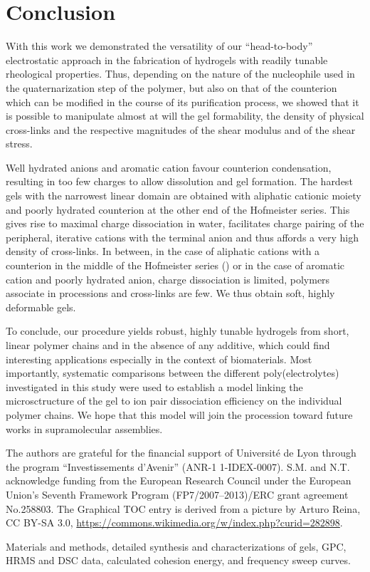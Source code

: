 \documentclass[journal=jacsat,manuscript=article]{achemso}
\begin{document}
\section{Conclusion}
With this work we demonstrated the versatility of our ``head-to-body'' electrostatic approach in the fabrication of hydrogels with readily tunable rheological properties. Thus, depending on the nature of the nucleophile used in the quaternarization step of the polymer, but also on that of the counterion which can be modified in the course of its purification process, we showed that it is possible to manipulate almost at will the gel formability, the density of physical cross-links and the respective magnitudes of the shear modulus and of the shear stress. 

Well hydrated anions and aromatic cation favour counterion condensation, resulting in too few charges to allow dissolution and gel formation. The hardest gels with the narrowest linear domain are obtained with aliphatic cationic moiety and poorly hydrated counterion at the other end of the Hofmeister series. This gives rise to maximal charge dissociation in water, facilitates charge pairing of the peripheral, iterative cations with the terminal anion and thus affords a very high density of cross-links. In between, in the case of aliphatic cations with a counterion in the middle of the Hofmeister series () or in the case of aromatic cation and poorly hydrated anion, charge dissociation is limited, polymers associate in processions and cross-links are few. We thus obtain soft, highly deformable gels.

To conclude, our procedure yields robust, highly tunable hydrogels from short, linear polymer chains and in the absence of any additive, which could find interesting applications especially in the context of biomaterials. Most importantly, systematic comparisons between the different poly(electrolytes) investigated in this study were used to establish a model linking the microsctructure of the gel to ion pair dissociation efficiency on the individual polymer chains. We hope that this model will join the procession toward future works in supramolecular assemblies.

\begin{acknowledgement}
The authors are grateful for the financial support of Université de Lyon through the program ``Investissements d'Avenir'' (ANR-1 1-IDEX-0007). S.M. and N.T. acknowledge funding from the European Research Council under the European Union's Seventh Framework Program (FP7/2007–2013)/ERC grant agreement No.258803. The Graphical TOC entry is derived from a picture by Arturo Reina, CC BY-SA 3.0, \url{https://commons.wikimedia.org/w/index.php?curid=282898}.
\end{acknowledgement}

\begin{suppinfo}

Materials and methods, detailed synthesis and characterizations of gels, GPC, HRMS and DSC data, calculated cohesion energy, and frequency sweep curves.

\end{suppinfo}


\end{document}
